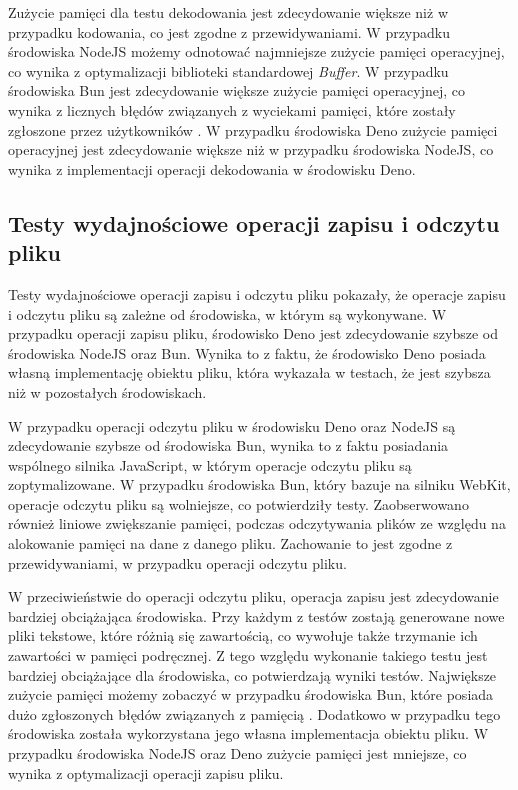 Zużycie pamięci dla testu dekodowania jest zdecydowanie większe niż w przypadku kodowania, co jest zgodne z przewidywaniami. W przypadku środowiska NodeJS możemy odnotować najmniejsze zużycie pamięci operacyjnej, co wynika z optymalizacji biblioteki standardowej \textit{Buffer}. W przypadku środowiska Bun jest zdecydowanie większe zużycie pamięci operacyjnej, co wynika z licznych błędów związanych z wyciekami pamięci, które zostały zgłoszone przez użytkowników \cite{bun_memory}. W przypadku środowiska Deno zużycie pamięci operacyjnej jest zdecydowanie większe niż w przypadku środowiska NodeJS, co wynika z implementacji operacji dekodowania w środowisku Deno.

\subsection{Testy wydajnościowe operacji zapisu i odczytu pliku}
Testy wydajnościowe operacji zapisu i odczytu pliku pokazały, że operacje zapisu i odczytu pliku są zależne od środowiska, w którym są wykonywane. W przypadku operacji zapisu pliku, środowisko Deno jest zdecydowanie szybsze od środowiska NodeJS oraz Bun. Wynika to z faktu, że środowisko Deno posiada własną implementację obiektu pliku, która wykazała w testach, że jest szybsza niż w pozostałych środowiskach.

W przypadku operacji odczytu pliku w środowisku Deno oraz NodeJS są zdecydowanie szybsze od środowiska Bun, wynika to z faktu posiadania wspólnego silnika JavaScript, w którym operacje odczytu pliku są zoptymalizowane. W przypadku środowiska Bun, który bazuje na silniku WebKit, operacje odczytu pliku są wolniejsze, co potwierdziły testy. Zaobserwowano również liniowe zwiększanie pamięci, podczas odczytywania plików ze względu na alokowanie pamięci na dane z danego pliku. Zachowanie to jest zgodne z przewidywaniami, w przypadku operacji odczytu pliku.

W przeciwieństwie do operacji odczytu pliku, operacja zapisu jest zdecydowanie bardziej obciążająca środowiska. Przy każdym z testów zostają generowane nowe pliki tekstowe, które różnią się zawartością, co wywołuje także trzymanie ich zawartości w pamięci podręcznej. Z tego względu wykonanie takiego testu jest bardziej obciążające dla środowiska, co potwierdzają wyniki testów. Największe zużycie pamięci możemy zobaczyć w przypadku środowiska Bun, które posiada dużo zgłoszonych błędów związanych z pamięcią \cite{bun_memory}. Dodatkowo w przypadku tego środowiska została wykorzystana jego własna implementacja obiektu pliku. W przypadku środowiska NodeJS oraz Deno zużycie pamięci jest mniejsze, co wynika z optymalizacji operacji zapisu pliku.

